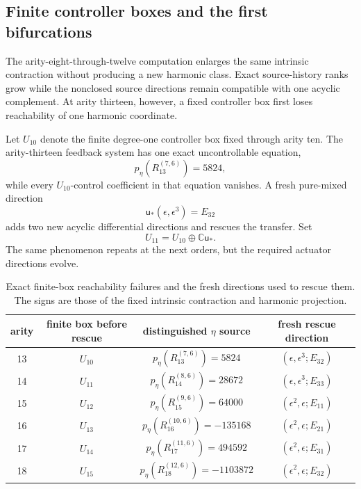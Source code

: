 \documentclass[11pt]{amsart}
\newcommand{\C}{\mathbb C}
\begin{document}
\subsection{Finite controller boxes and the first bifurcations}

The arity-eight-through-twelve computation enlarges the same intrinsic contraction without producing a new harmonic class.  Exact source-history ranks grow while the nonclosed source directions remain compatible with one acyclic complement.  At arity thirteen, however, a fixed controller box first loses reachability of one harmonic coordinate.

Let $U_{10}$ denote the finite degree-one controller box fixed through arity ten.  The arity-thirteen feedback system has one exact uncontrollable equation,
\begin{equation}\label{eq:arity13-danger}
\boxed{p_\eta(R_{13}^{(7,6)})=5824,}
\end{equation}
while every $U_{10}$-control coefficient in that equation vanishes.  A fresh pure-mixed direction
\[
\mathsf u_*(\epsilon,\epsilon^3)=E_{32}
\]
adds two new acyclic differential directions and rescues the transfer.  Set
\[
U_{11}=U_{10}\oplus\C\mathsf u_*.
\]
The same phenomenon repeats at the next orders, but the required actuator directions evolve.

\begin{table}[ht]
\centering
\small
\begin{tabular}{@{}cccc@{}}
\toprule
arity & finite box before rescue & distinguished $\eta$ source & fresh rescue direction \\
\midrule
13 & $U_{10}$ & $p_\eta(R_{13}^{(7,6)})=5824$ & $(\epsilon,\epsilon^3;E_{32})$ \\
14 & $U_{11}$ & $p_\eta(R_{14}^{(8,6)})=28672$ & $(\epsilon,\epsilon^3;E_{33})$ \\
15 & $U_{12}$ & $p_\eta(R_{15}^{(9,6)})=64000$ & $(\epsilon^2,\epsilon;E_{11})$ \\
16 & $U_{13}$ & $p_\eta(R_{16}^{(10,6)})=-135168$ & $(\epsilon^2,\epsilon;E_{21})$ \\
17 & $U_{14}$ & $p_\eta(R_{17}^{(11,6)})=494592$ & $(\epsilon^2,\epsilon;E_{31})$ \\
18 & $U_{15}$ & $p_\eta(R_{18}^{(12,6)})=-1103872$ & $(\epsilon^2,\epsilon;E_{32})$ \\
\bottomrule
\end{tabular}
\caption{Exact finite-box reachability failures and the fresh directions used to rescue them.  The signs are those of the fixed intrinsic contraction and harmonic projection.}
\label{tab:finite-box-bifurcation}
\end{table}
\end{document}
